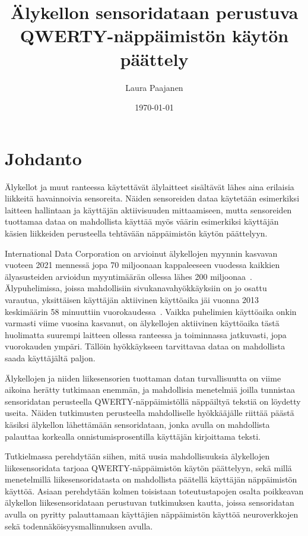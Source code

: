 \documentclass[finnish]{tktltiki2}
\title{Älykellon sensoridataan perustuva QWERTY-näppäimistön käytön päättely}
\author{Laura Paajanen}
\date{\today}
\theoremstyle{definition}
\theoremstyle{remark}
\begin{document}

\frontmatter      %

\maketitle        %
\makeabstract     %

\tableofcontents  %


\mainmatter       %

\section{Johdanto}

Älykellot ja muut ranteessa käytettävät älylaitteet sisältävät lähes aina erilaisia liikkeitä havainnoivia sensoreita. Näiden sensoreiden dataa käytetään esimerkiksi laitteen hallintaan ja käyttäjän aktiivisuuden mittaamiseen, mutta sensoreiden tuottamaa dataa on mahdollista käyttää myös väärin esimerkiksi käyttäjän käsien liikkeiden perusteella tehtävään näppäimistön käytön päättelyyn. 

International Data Corporation on arvioinut älykellojen myynnin kasvavan vuoteen 2021 mennessä jopa 70 miljoonaan kappaleeseen vuodessa kaikkien älyasusteiden arvioidun myyntimäärän ollessa lähes 200 miljoonaa~\cite{bi}. Älypuhelimissa, joissa mahdollisiin sivukanavahyökkäyksiin on jo osattu varautua, yksittäisen käyttäjän aktiivinen käyttöaika jäi vuonna 2013 keskimäärin 58 minuuttiin vuorokaudessa~\cite{john}. Vaikka puhelimien käyttöaika onkin varmasti viime vuosina kasvanut,  on älykellojen aktiivinen käyttöaika tästä huolimatta suurempi laitteen ollessa ranteessa ja toiminnassa jatkuvasti, jopa vuorokauden ympäri. Tällöin hyökkäykseen tarvittavaa dataa on mahdollista saada käyttäjältä paljon. 

Älykellojen ja niiden liikesensorien tuottaman datan turvallisuutta on viime aikoina herätty tutkimaan enemmän, ja mahdollisia menetelmiä joilla tunnistaa sensoridatan perusteella QWERTY-näppäimistöllä näppäiltyä tekstiä on löydetty useita. Näiden tutkimusten perusteella mahdolliselle hyökkääjälle riittää päästä käsiksi älykellon lähettämään sensoridataan, jonka avulla on mahdollista palauttaa korkealla onnistumisprosentilla käyttäjän kirjoittama teksti.

Tutkielmassa perehdytään siihen, mitä uusia mahdollisuuksia älykellojen liikesensoridata tarjoaa QWERTY-näppäimistön käytön päättelyyn, sekä millä menetelmillä liikesensoridatasta on mahdollista päätellä käyttäjän näppäimistön käyttöä. Asiaan perehdytään kolmen toisistaan toteutustapojen osalta poikkeavan älykellon liikesensoridataan perustuvan tutkimuksen kautta, joissa sensoridatan avulla on pyritty palauttamaan käyttäjien näppäimistön käyttöä neuroverkkojen sekä todennäköisyysmallinnuksen avulla.
\end{document}
